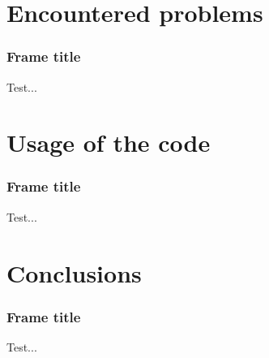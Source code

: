 \documentclass{beamer}
\begin{document}

\section{Encountered problems}


\begin{frame}
\frametitle{Frame title}

Test...

\end{frame}




\section{Usage of the code}


\begin{frame}
\frametitle{Frame title}

Test...

\end{frame}




\section{Conclusions}


\begin{frame}
\frametitle{Frame title}

Test...

\end{frame}
\end{document}
